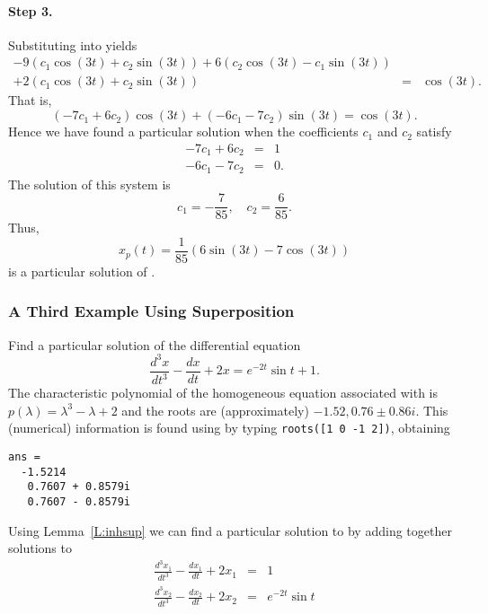 \paragraph{Step 3.} Substituting  into  yields
\begin{eqnarray*}
-9(c_1\cos(3t)+c_2 \sin(3t)) +6(c_2\cos(3t)-c_1\sin(3t)) & & \\
+2(c_1 \cos(3t)+ c_2 \sin(3t)) &  = & \cos(3t).
\end{eqnarray*}
That is,
\[
(-7c_1+6c_2)\cos(3t)+(-6c_1-7c_2)\sin(3t) = \cos(3t).
\]
Hence we have found a particular solution when the coefficients $c_1$ and 
$c_2$ satisfy 
\begin{eqnarray*}
-7c_1 +6c_2 & = & 1\\
-6c_1 -7c_2 & = & 0.
\end{eqnarray*}
The solution of this system is 
\[
c_1 = -\frac{7}{85},\quad c_2 = \frac{6}{85}.
\]
Thus, 
\[
x_p(t) = \frac{1}{85}(6\sin(3t)-7\cos(3t))
\]
is a particular solution of .

\subsubsection*{A Third Example Using Superposition}

Find a particular solution of the differential equation
\begin{equation}  \label{e:underdet3}
\frac{d^3x}{dt^3} -\frac{dx}{dt} + 2x = e^{-2t}\sin t + 1.
\end{equation}
The characteristic polynomial of the homogeneous equation associated with 
 is $p(\lambda)=\lambda^3-\lambda+2$ and the roots are 
(approximately) $-1.52, 0.76 \pm 0.86i$.  This (numerical) information is
found using \Matlab by typing 
{\tt roots([1 0 -1 2])}, obtaining
\begin{verbatim}
ans =
  -1.5214       
   0.7607 + 0.8579i     
   0.7607 - 0.8579i
\end{verbatim}

Using Lemma~\ref{L:inhsup} we can find a particular solution to 
 by adding together solutions to 
\begin{eqnarray}
\frac{d^3x_1}{dt^3} -\frac{dx_1}{dt} + 2x_1 & = & 1 \label{e:underdet3-1}\\
\frac{d^3x_2}{dt^3} -\frac{dx_2}{dt} + 2x_2 & = & e^{-2t}\sin t 
\label{e:underdet3-2}
\end{eqnarray}

